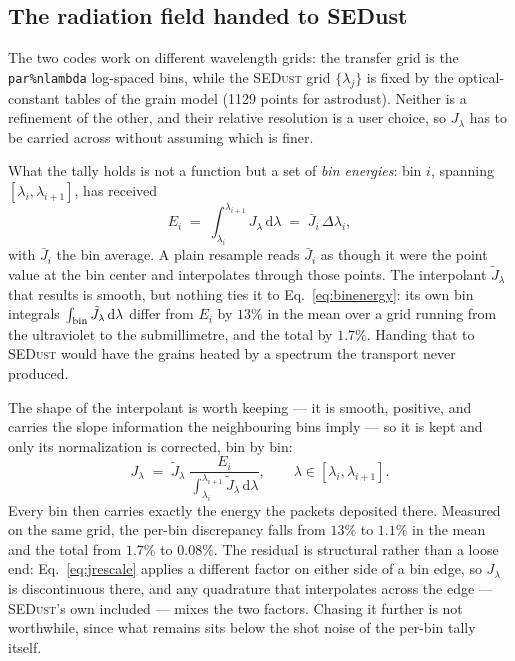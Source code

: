 \documentclass[english,a4paper]{kiseon_memo}
\newcommand{\Jlam}{J_\lambda}
\newcommand{\dd}{\mathrm{d}}
\newcommand{\pp}[1]{\texttt{par\%#1}}
\begin{document}
\subsection{The radiation field handed to SEDust}\label{sec:jhandoff}
The two codes work on different wavelength grids: the transfer grid is the
\pp{nlambda} log-spaced bins, while the \textsc{SEDust} grid $\{\lambda_j\}$ is
fixed by the optical-constant tables of the grain model (1129 points for
astrodust).  Neither is a refinement of the other, and their relative resolution
is a user choice, so $\Jlam$ has to be carried across without assuming which is
finer.

What the tally holds is not a function but a set of \emph{bin energies}: bin $i$,
spanning $[\lambda_i,\lambda_{i+1}]$, has received
\begin{equation}
  E_i \;=\; \int_{\lambda_i}^{\lambda_{i+1}}\! \Jlam \,\dd\lambda
  \;=\; \bar J_i\,\Delta\lambda_i ,
  \label{eq:binenergy}
\end{equation}
with $\bar J_i$ the bin average.  A plain resample reads $\bar J_i$ as though it
were the point value at the bin center and interpolates through those points.
The interpolant $\tilde J_\lambda$ that results is smooth, but nothing ties it to
Eq.~\eqref{eq:binenergy}: its own bin integrals
$\int_{\rm bin}\tilde J_\lambda\,\dd\lambda$ differ from $E_i$ by
$13\%$ in the mean over a grid running from the ultraviolet to the
submillimetre, and the total by $1.7\%$.  Handing that to \textsc{SEDust} would
have the grains heated by a spectrum the transport never produced.

The shape of the interpolant is worth keeping --- it is smooth, positive, and
carries the slope information the neighbouring bins imply --- so it is kept and
only its normalization is corrected, bin by bin:
\begin{equation}
  \Jlam \;=\; \tilde J_\lambda \;
     \frac{E_i}{\displaystyle\int_{\lambda_i}^{\lambda_{i+1}}\!\tilde J_\lambda\,\dd\lambda},
  \qquad \lambda\in[\lambda_i,\lambda_{i+1}] .
  \label{eq:jrescale}
\end{equation}
Every bin then carries exactly the energy the packets deposited there.  Measured
on the same grid, the per-bin discrepancy falls from $13\%$ to $1.1\%$ in the
mean and the total from $1.7\%$ to $0.08\%$.  The residual is structural rather
than a loose end: Eq.~\eqref{eq:jrescale} applies a different factor on either
side of a bin edge, so $\Jlam$ is discontinuous there, and any quadrature that
interpolates across the edge --- \textsc{SEDust}'s own included --- mixes the two
factors.  Chasing it further is not worthwhile, since what remains sits below the
shot noise of the per-bin tally itself.
\end{document}
